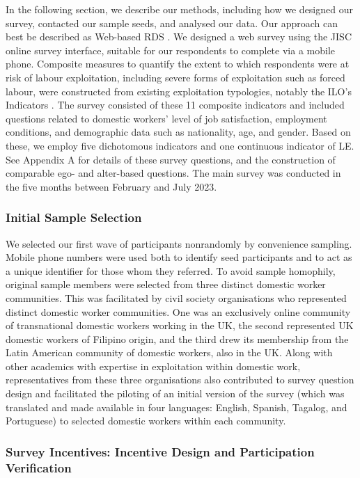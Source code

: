 \documentclass[
  12pt,
  letterpaper,
  DIV=11,
  numbers=noendperiod]{scrartcl}
\theoremstyle{plain}
\theoremstyle{definition}
\begin{document}
In the following section, we describe our methods, including how we
designed our survey, contacted our sample seeds, and analysed our data.
Our approach can best be described as Web-based RDS
\autocite{wejnert_web-based_2008}. We designed a web survey using the
JISC online survey interface, suitable for our respondents to complete
via a mobile phone. Composite measures to quantify the extent to which
respondents were at risk of labour exploitation, including severe forms
of exploitation such as forced labour, were constructed from existing
exploitation typologies, notably the ILO's Indicators
\autocite{ILO11-indicators}. The survey consisted of these 11 composite
indicators and included questions related to domestic workers' level of
job satisfaction, employment conditions, and demographic data such as
nationality, age, and gender. Based on these, we employ five dichotomous
indicators and one continuous indicator of LE. See Appendix A for
details of these survey questions, and the construction of comparable
ego- and alter-based questions. The main survey was conducted in the
five months between February and July 2023.

\subsubsection{Initial Sample Selection}\label{initial-sample-selection}

We selected our first wave of participants nonrandomly by convenience
sampling. Mobile phone numbers were used both to identify seed
participants and to act as a unique identifier for those whom they
referred. To avoid sample homophily, original sample members were
selected from three distinct domestic worker communities. This was
facilitated by civil society organisations who represented distinct
domestic worker communities. One was an exclusively online community of
transnational domestic workers working in the UK, the second represented
UK domestic workers of Filipino origin, and the third drew its
membership from the Latin American community of domestic workers, also
in the UK. Along with other academics with expertise in exploitation
within domestic work, representatives from these three organisations
also contributed to survey question design and facilitated the piloting
of an initial version of the survey (which was translated and made
available in four languages: English, Spanish, Tagalog, and Portuguese)
to selected domestic workers within each community.

\subsubsection{Survey Incentives: Incentive Design and Participation
Verification}\label{survey-incentives-incentive-design-and-participation-verification}
\end{document}
